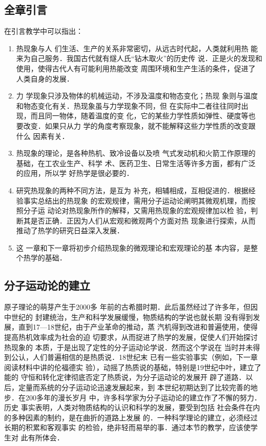 \subsection{全章引言}
在引言教学中可以指出：
\begin{enumerate}
    \item 热现象与人
们生活、生产的关系非常密切，从远古时代起，人类就利用热
能来为自己服务．我国古代就有燧人氏“钻木取火”的历史传
说．正是火的发现和使用，使得古代人有可能利用热能改变
周围环境和生产生活的条件，促进了人类自身的发展．
\item 力
学现象只涉及物体的机械运动，不涉及温度和物态变化；热现
象则与温度和物态变化有关．热现象虽与力学现象不同，但
在实际中二者往往同时出现，而且同一物体，随着温度的变
化，它的某些力学性质如弹性、硬度等也要改变．如果只从力
学的角度考察现象，就不能解释这些力学性质的改变跟什么
因素有关．  
\item 热现象的理论，是各种热机、致冷设备以及喷
气式发动机和火箭工作原理的基础，在工农业生产、科学
术、医药卫生、日常生活等许多方面，都有广泛的应用，所以学
好热学是很必要的．  
\item 研究热现象的两种不同方法，是互为
补充，相辅相成，互相促进的．根据经验事实总结出的热现象
的宏观规律，需用分子运动论阐明其微观机理，而按照分子运
动论对热现象所作的解释，又需用热现象的宏观规律加以检
验，判断其是否正确．正因为人们从宏观和微观两个方面对热
现象进行探索，从而推动了热学的研究日益深入发展．
\item 这
一章和下一章将初步介绍热现象的微观理论和宏观理论的基
本内容，是整个热学的基础．
\end{enumerate}

\subsection{分子运动论的建立} 原子理论的萌芽产生于2000多
年前的古希腊时期．此后虽然经过了许多年，但因中世纪的
封建统治，生产和科学发展缓慢，物质结构的学说也就长期
没有得到发展，直到17—18世纪，由于产业革命的推动，蒸
汽机得到改进和普遍使用，使得提高热机效率成为社会的迫
切要求，从而捉进了热学的发展，促使人们开始探讨热现象的
本质，于是出现了定性的分子运动论学说．然而这个学说在
当时并未得到公认，人们普遍相信的是热质说．18世纪末
已有一些实验事实（例如，下一章阅读材料中讲的伦福德实
验），动摇了热质说的基础，特别是19世纪中叶，建立了能的
守恒和转化定律彻底否定了热质说，为分子运动论的发展开
辟了道路．以后，定量而系统的分子运动论迅速发展起来，到
本世纪初期达到了比较完善的地步．在200多年的漫长岁月
中，许多科学家为分子运动论的建立作了不懈的努力．历史
事实表明，人类对物质结构的认识和科学的发展，要受到包括
社会条件在内的多种因素的制约，是在曲折的道路上发展
的．一种科学理论的建立，必须经过长期的积累和客观事实
的检验，绝非轻而易举的事．通过本节的教学，应该使学生对
此有所体会．

